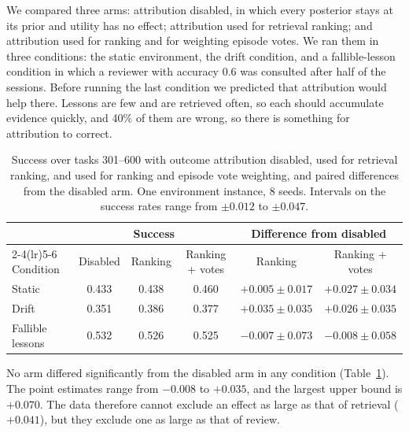 \documentclass{article}
\begin{document}
We compared three arms: attribution disabled, in which every posterior stays at its
prior and utility has no effect; attribution used for retrieval ranking; and attribution
used for ranking and for weighting episode votes. We ran them in three conditions: the
static environment, the drift condition, and a fallible-lesson condition in which a
reviewer with accuracy 0.6 was consulted after half of the sessions. Before running the
last condition we predicted that attribution would help there. Lessons are few and are
retrieved often, so each should accumulate evidence quickly, and 40\% of them are wrong,
so there is something for attribution to correct.

\begin{table}[t]
\centering
\caption{Success over tasks 301--600 with outcome attribution disabled, used for
retrieval ranking, and used for ranking and episode vote weighting, and paired
differences from the disabled arm. One environment instance, 8 seeds. Intervals on the
success rates range from $\pm 0.012$ to $\pm 0.047$.}
\label{tab:attribution}
\small
\begin{tabular}{lccccc}
\toprule
& \multicolumn{3}{c}{Success} & \multicolumn{2}{c}{Difference from disabled} \\
\cmidrule(lr){2-4}\cmidrule(lr){5-6}
Condition & Disabled & Ranking & Ranking + votes & Ranking & Ranking + votes \\
\midrule
Static & 0.433 & 0.438 & 0.460 & $+0.005 \pm 0.017$ & $+0.027 \pm 0.034$ \\
Drift & 0.351 & 0.386 & 0.377 & $+0.035 \pm 0.035$ & $+0.026 \pm 0.035$ \\
Fallible lessons & 0.532 & 0.526 & 0.525 & $-0.007 \pm 0.073$ & $-0.008 \pm 0.058$ \\
\bottomrule
\end{tabular}
\end{table}

No arm differed significantly from the disabled arm in any condition
(Table~\ref{tab:attribution}). The point estimates range from $-0.008$ to $+0.035$, and
the largest upper bound is $+0.070$. The data therefore cannot exclude an effect as large
as that of retrieval ($+0.041$), but they exclude one as large as that of review.
\end{document}
